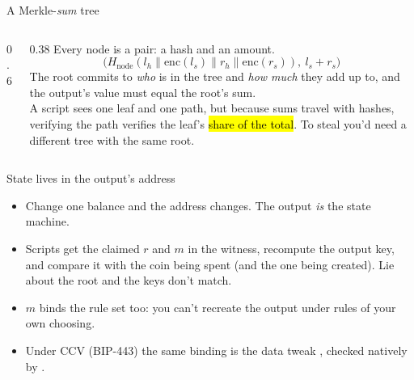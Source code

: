 \documentclass[aspectratio=169,10pt]{beamer}
\begin{document}
\begin{frame}{A Merkle-\emph{sum} tree}
  \begin{columns}[c]
    \begin{column}{0.6\textwidth}
    \end{column}
    \begin{column}{0.38\textwidth}
      \small
      Every node is a pair: a hash and an amount.
      {\footnotesize\[ \bigl(H_{\mathrm{node}}(l_h \| \mathrm{enc}(l_s) \| r_h \| \mathrm{enc}(r_s)),\ l_s + r_s\bigr) \]}
      The root commits to \emph{who} is in the tree and \emph{how much} they add up to,
      and the output's value must equal the root's sum.\\[0.6em]
      A script sees one leaf and one path, but because sums travel with hashes,
      verifying the path verifies the leaf's \hl{share of the total}.
      To steal you'd need a different tree with the same root.
    \end{column}
  \end{columns}
\end{frame}

\begin{frame}{State lives in the output's address}
  \centering
  \vspace{0.6em}
  \begin{itemize}
    \item Change one balance and the address changes. The output \emph{is} the state machine.
    \item Scripts get the claimed $r$ and $m$ in the witness, recompute the output key, and compare it with the coin being spent (and the one being created). Lie about the root and the keys don't match.
    \item $m$ binds the rule set too: you can't recreate the output under rules of your own choosing.
    \item Under CCV (BIP-443) the same binding is the data tweak , checked natively by .
  \end{itemize}
\end{frame}
\end{document}
